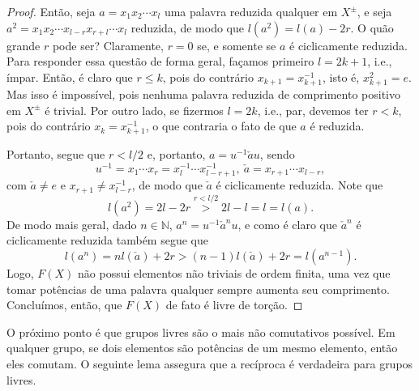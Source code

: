     	\begin{proof} 
        	Então, seja $a = x_1x_2\cdots x_l$ uma palavra reduzida qualquer em $X^{\pm}$, e seja 
        	$a^2 = x_1x_2\cdots x_{l-r}x_{r+l}\cdots x_l$ reduzida, de modo que $l(a^2) = l(a) - 2r$. O quão 
        	grande $r$ pode ser? Claramente, $r=0$ se, e somente se $a$ é ciclicamente reduzida. Para responder 
        	essa questão de forma geral, façamos primeiro $l = 2k + 1$, i.e., ímpar. Então, é claro que $r\leq k$,
        	pois do contrário $x_{k+1} = x_{k+1}^{-1}$, isto é, $x_{k+1}^2 = e$. Mas isso é impossível, pois 
        	nenhuma palavra reduzida de comprimento positivo em $X^{\pm}$ é trivial. Por outro lado, se 
        	fizermos $l = 2k$, i.e., par, devemos ter $r<k$, pois do contrário $x_k = x_{k+1}^{-1}$, o que 
        	contraria o fato de que $a$ é reduzida.
    	
    	    \par\vspace{0.3cm} Portanto, segue que $r< l/2$ e, portanto, $a = u^{-1}\check{a}u$, sendo
    		\begin{equation*}
    		    u^{-1} = x_1\cdots x_r = x_l^{-1}\cdots x_{l-r+1}^{-1}, \ \check{a} = x_{r+1}\cdots x_{l-r},
    		\end{equation*}
    		com $\check{a}\neq e$ e $x_{r+1}\neq x_{l-r}^{-1}$, de modo que 
    		$\check{a}$ é ciclicamente reduzida. Note que 
    		\begin{equation*}
    		    l(a^2) = 2l - 2r \stackrel{r<l/2}{>} 2l - l = l = l(a).
    		\end{equation*}
    		De modo mais geral, dado $n\in\mathbb{N}$, $a^n = u^{-1}\check{a}^nu$, 
    		e como é claro que $\check{a}^n$ é ciclicamente reduzida também segue que 
    		\begin{equation}
    		\label{comprimento de a^n}
    		    l(a^n) = nl(\check{a}) + 2r > (n-1)l(\check{a}) + 2r = l(a^{n-1}).
    		\end{equation}
    		Logo, $F(X)$ não possui elementos não triviais de ordem finita, uma vez 
    		que tomar potências de uma palavra qualquer sempre aumenta seu comprimento. Concluímos, então, 
    		que $F(X)$ de fato é livre de torção.
    	\end{proof}
    	O próximo ponto é que grupos livres são o mais não comutativos possível. 
    	Em qualquer grupo, se dois elementos são potências de um mesmo elemento, então eles comutam. 
    	O seguinte lema assegura que a recíproca é verdadeira para grupos livres.
